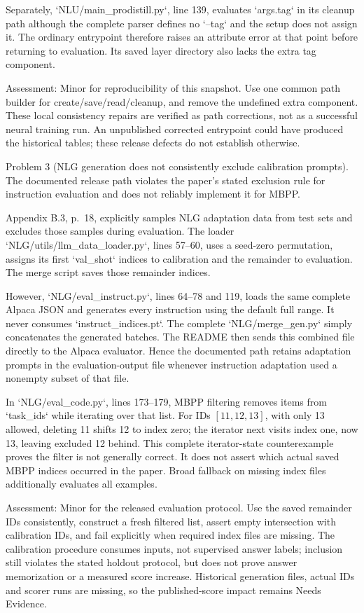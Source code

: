 \documentclass[10pt]{article}
\begin{document}
Separately, `NLU/main\_prodistill.py`, line 139, evaluates `args.tag` in its cleanup path although the complete parser defines no `–tag` and the setup does not assign it. The ordinary entrypoint therefore raises an attribute error at that point before returning to evaluation. Its saved layer directory also lacks the extra tag component.\par
Assessment: Minor for reproducibility of this snapshot. Use one common path builder for create/save/read/cleanup, and remove the undefined extra component. These local consistency repairs are verified as path corrections, not as a successful neural training run. An unpublished corrected entrypoint could have produced the historical tables; these release defects do not establish otherwise.\par
Problem 3 (NLG generation does not consistently exclude calibration prompts).  The documented release path violates the paper’s stated exclusion rule for instruction evaluation and does not reliably implement it for MBPP.\par
Appendix B.3, p. 18, explicitly samples NLG adaptation data from test sets and excludes those samples during evaluation. The loader `NLG/utils/llm\_data\_loader.py`, lines 57–60, uses a seed-zero permutation, assigns its first `val\_shot` indices to calibration and the remainder to evaluation. The merge script saves those remainder indices.\par
However, `NLG/eval\_instruct.py`, lines 64–78 and 119, loads the same complete Alpaca JSON and generates every instruction using the default full range. It never consumes `instruct\_indices.pt`. The complete `NLG/merge\_gen.py` simply concatenates the generated batches. The README then sends this combined file directly to the Alpaca evaluator. Hence the documented path retains adaptation prompts in the evaluation-output file whenever instruction adaptation used a nonempty subset of that file.\par
In `NLG/eval\_code.py`, lines 173–179, MBPP filtering removes items from `task\_ids` while iterating over that list. For IDs \([11,12,13]\), with only 13 allowed, deleting 11 shifts 12 to index zero; the iterator next visits index one, now 13, leaving excluded 12 behind. This complete iterator-state counterexample proves the filter is not generally correct. It does not assert which actual saved MBPP indices occurred in the paper. Broad fallback on missing index files additionally evaluates all examples.\par
Assessment: Minor for the released evaluation protocol. Use the saved remainder IDs consistently, construct a fresh filtered list, assert empty intersection with calibration IDs, and fail explicitly when required index files are missing. The calibration procedure consumes inputs, not supervised answer labels; inclusion still violates the stated holdout protocol, but does not prove answer memorization or a measured score increase. Historical generation files, actual IDs and scorer runs are missing, so the published-score impact remains Needs Evidence.\par
\end{document}
